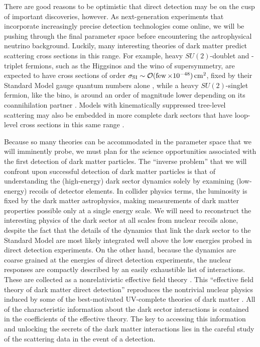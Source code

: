 \documentclass[11pt]{article}
\newcommand{\tenx}[1]{\times 10^{#1}}
\begin{document}
There are good reasons to be optimistic that direct detection may be on the cusp of important discoveries, however. As next-generation experiments that incorporate increasingly precise detection technologies come online, we will be pushing through the final parameter space before encountering the astrophysical neutrino background. Luckily, many interesting theories of dark matter predict scattering cross sections in this range. For example, heavy $SU(2)$-doublet and -triplet fermions, such as the Higgsinos and the wino of supersymmetry, are expected to have cross sections of order $\sigma_{\rm SI} \sim \cO(\few\tenx{-48})\cm^2$, fixed by their Standard Model gauge quantum numbers alone \cite{Hill:2011be,Hill:2013hoa,Hill:2014yxa}, while a heavy $SU(2)$-singlet fermion, like the bino, is around an order of magnitude lower depending on its coannihilation partner \cite{Berlin:2015njh}. Models with kinematically suppressed tree-level scattering may also be embedded in more complete dark sectors that have loop-level cross sections in this same range \cite{Ipek:2014gua,McDermott:2014rqa,Appelquist:2015yfa,Appelquist:2015zfa}.

Because so many theories can be accommodated in the parameter space that we will imminently probe, we must plan for the science opportunities associated with the first detection of dark matter particles. The ``inverse problem'' that we will confront upon successful detection of dark matter particles is that of understanding the (high-energy) dark sector dynamics solely by examining (low-energy) recoils of detector elements. In collider physics terms, the luminosity is fixed by the dark matter astrophysics, making measurements of dark matter properties possible only at a single energy scale. We will need to reconstruct the interesting physics of the dark sector at all scales from nuclear recoils alone, despite the fact that the details of the dynamics that link the dark sector to the Standard Model are most likely integrated well above the low energies probed in direct detection experiments. On the other hand, because the dynamics are coarse grained at the energies of direct detection experiments, the nuclear responses are compactly described by an easily exhaustible list of interactions. These are collected as a nonrelativistic effective field theory \cite{Fitzpatrick:2012ix, Anand:2013yka}. This ``effective field theory of dark matter direct detection'' reproduces the nontrivial nuclear physics induced by some of the best-motivated UV-complete theories of dark matter \cite{Gresham:2014vja, Gluscevic:2015sqa}. %
All of the characteristic information about the dark sector interactions is contained in the coefficients of the effective theory. The key to accessing this information and unlocking the secrets of the dark matter interactions lies in the careful study of the scattering data in the event of a detection.
\end{document}
